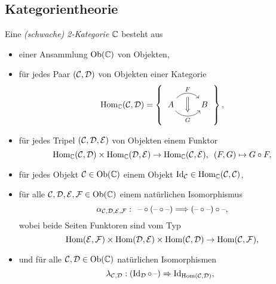 \documentclass{cheat-sheet}
\newenvironment{centertikzcd}
  {\begin{center}\begin{tikzcd}}
  {\end{tikzcd}\end{center}}
\begin{document}
\begin{samepage}
  \section{Kategorientheorie}
\end{samepage}


\begin{defn}
  Eine \emph{(schwache) 2-Kategorie} $\mathbb{C}$ besteht aus
  \begin{itemize}
    \item einer Ansammlung $\operatorname{Ob}(\mathbb{C})$ von Objekten,
    \item für jedes Paar $(\mathcal{C}, \mathcal{D})$ von Objekten einer Kategorie
    \[
      \Hom_{\C}(\Cat, \Dat) = \left\{\,
      \begin{tikzcd}
        A \arrow[r, bend left=50, "F"{above}, ""{name=U, below}]
        \arrow[r, bend right=50, "G"{below}, ""{name=D, above}]
        & B
        \arrow[Rightarrow, from=U, to=D]
      \end{tikzcd}
      \,\right\},
    \]
    \item für jedes Tripel $(\mathcal{C}, \mathcal{D}, \mathcal{E})$ von Objekten einem Funktor
    \[
      \operatorname{Hom}_{\mathbb{C}}(\mathcal{C}, \mathcal{D}) \times \operatorname{Hom}_{\mathbb{C}}(\mathcal{D}, \mathcal{E}) \to \operatorname{Hom}_{\mathbb{C}}(\mathcal{C}, \mathcal{E}), \enspace
      (F, G) \mapsto G \circ F,
    \]
    \item für jedes Objekt $\mathcal{C} \in \operatorname{Ob}(\mathbb{C})$ einem Objekt $\operatorname{Id}_{\mathcal{C}} \in \operatorname{Hom}_{\mathbb{C}}(\mathcal{C}, \mathcal{C})$,
    \item für alle $\mathcal{C}, \mathcal{D}, \mathcal{E}, \mathcal{F} \in \operatorname{Ob}(\mathbb{C})$ einem natürlichen Isomorphismus
    \[ \alpha_{\mathcal{C}, \mathcal{D}, \mathcal{E}, \mathcal{F}} : \enspace \text{--} \circ (\text{--} \circ \text{--}) \Longrightarrow (\text{--} \circ \text{--}) \circ \text{--}, \]
    wobei beide Seiten Funktoren sind vom Typ
    \[ \operatorname{Hom}(\mathcal{E}, \mathcal{F}) \times \operatorname{Hom}(\mathcal{D}, \mathcal{E}) \times \operatorname{Hom}(\mathcal{C}, \mathcal{D}) \to \operatorname{Hom}(\mathcal{C}, \mathcal{F}), \]
    \iffalse
    \begin{centertikzcd}[column sep=1cm, row sep=0.5cm]
      & \Hom(\Cat, \Eat) \times \Hom(\Eat, \Fat) \arrow[rd] \\
      \Hom(\Cat, \Dat) \times \Hom(\Dat, \Eat) \times \Hom(\Eat, \Fat) \arrow[ru] \arrow[rd] & \Hom(\Cat, \Fat) \\
      & \Hom(\Cat, \Dat) \times \Hom(\Dat, \Fat)
    \end{centertikzcd}
    \fi
    \item und für alle $\mathcal{C}, \mathcal{D} \in \operatorname{Ob}(\mathbb{C})$ natürlichen Isomorphismen
    \[
      \lambda_{\mathcal{C}, \mathcal{D}} : (\operatorname{Id}_{\mathcal{D}} \circ \, \text{--}) \Rightarrow \operatorname{Id}_{\operatorname{Hom}(\mathcal{C}, \mathcal{D})}, \enspace
\]
\end{itemize}
\end{defn}
\end{document}

